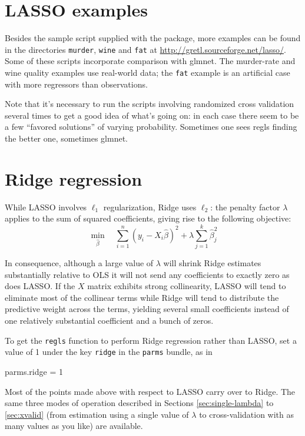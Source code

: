 \documentclass{article}
\begin{document}
\section{LASSO examples}
\label{sec:examples}

Besides the sample script supplied with the package, more examples can
be found in the directories \texttt{murder}, \texttt{wine} and
\texttt{fat} at \url{http://gretl.sourceforge.net/lasso/}.  Some of
these scripts incorporate comparison with \textsf{glmnet}.  The
murder-rate and wine quality examples use real-world data; the
\texttt{fat} example is an artificial case with more regressors than
observations.

Note that it's necessary to run the scripts involving randomized cross
validation several times to get a good idea of what's going on: in
each case there seem to be a few ``favored solutions'' of varying
probability. Sometimes one sees \textsf{regls} finding the better one,
sometimes \textsf{glmnet}.

\section{Ridge regression}
\label{sec:ridge}

While LASSO involves $\ell_1$ regularization, Ridge uses $\ell_2$: the
penalty factor $\lambda$ applies to the sum of squared coefficients,
giving rise to the following objective:
\begin{equation}
  \label{eq:ridge-obj}
  \min_{\hat{\beta}} \quad
  \sum_{i=1}^n (y_i - X_i\hat{\beta})^2 + \lambda \sum_{j=1}^k \hat{\beta}_j^2
\end{equation}

In consequence, although a large value of $\lambda$ will shrink Ridge
estimates substantially relative to OLS it will not send any
coefficients to exactly zero as does LASSO. If the $X$ matrix exhibits
strong collinearity, LASSO will tend to eliminate most of the
collinear terms while Ridge will tend to distribute the predictive
weight across the terms, yielding several small coefficients instead
of one relatively substantial coefficient and a bunch of zeros.

To get the \texttt{regls} function to perform Ridge regression rather
than LASSO, set a value of 1 under the key \texttt{ridge} in the
\texttt{parms} bundle, as in
\begin{code}
parms.ridge = 1
\end{code}

Most of the points made above with respect to LASSO carry over to
Ridge. The same three modes of operation described in Sections
\ref{sec:single-lambda} to \ref{sec:xvalid} (from estimation using a
single value of $\lambda$ to cross-validation with as many values as
you like) are available.
\end{document}

